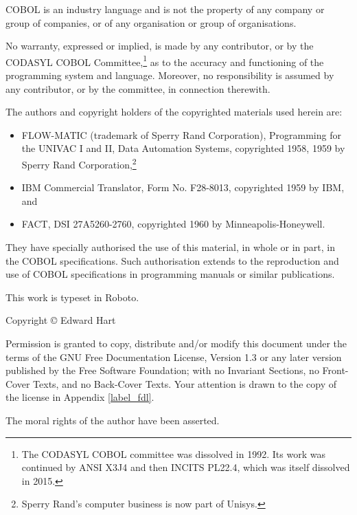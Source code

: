 \documentclass[a4paper,oneside,svgnames]{scrbook}
\begin{document}
\vspace*{\fill}

COBOL is an industry language and is not the property of any company or group of companies, or of any organisation or group of organisations.

No warranty, expressed or implied, is made by any contributor, or by the CODASYL COBOL Committee,\footnote{The CODASYL COBOL committee was dissolved in 1992. Its work was continued by ANSI X3J4 and then INCITS PL22.4, which was itself dissolved in 2015.} as to the accuracy and functioning of the programming system and language. Moreover, no responsibility is assumed by any contributor, or by the committee, in connection therewith.

The authors and copyright holders of the copyrighted materials used herein are:
\begin{itemize}
\item FLOW-MATIC (trademark of Sperry Rand Corporation), Programming for the UNIVAC \textregistered{} I and II, Data Automation Systems, copyrighted 1958, 1959 by Sperry Rand Corporation,\footnote{Sperry Rand's computer business is now part of Unisys.}
\item IBM Commercial Translator, Form No. F28-8013, copyrighted 1959 by IBM, and
\item FACT, DSI 27A5260-2760, copyrighted 1960 by Minneapolis-Honeywell.
\end{itemize}

They have specially authorised the use of this material, in whole or in part, in the COBOL specifications. Such authorisation extends to the reproduction and use of COBOL specifications in programming manuals or similar publications.

\vfill

\begin{center}
  This work is typeset in Roboto.
\end{center}

\vfill

\begin{center}
  Copyright \copyright{} \the\year{} Edward Hart

\vspace{5pt}

Permission is granted to copy, distribute and\slash{}or modify this document under the terms of the GNU Free Documentation License, Version 1.3 or any later version published by the Free Software Foundation; with no Invariant Sections, no Front-Cover Texts, and no Back-Cover Texts. Your attention is drawn to the copy of the license in Appendix \ref{label_fdl}.
\vspace{5pt}

  The moral rights of the author have been asserted.
\end{center}
\end{document}
